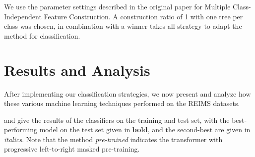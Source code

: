 We use the parameter settings described in the original paper \citep{Tran2019} for Multiple Class-Independent Feature Construction. A construction ratio of 1 with one tree per class was chosen, in combination with a winner-takes-all strategy to adapt the method for classification. 

\section{Results and Analysis}
\label{sec:results-and-discusssion}

After implementing our classification strategies, we now present and analyze how these various machine learning techniques performed on the REIMS datasets.

 and  give the results of the classifiers on the training and test set, 
with the best-performing model on the test set given in \textbf{bold}, and the second-best are given in \textit{italics}. Note that the method \textit{pre-trained} indicates the transformer with progressive left-to-right masked pre-training.

